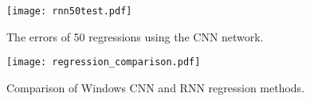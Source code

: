 \documentclass[../main.tex]{subfiles}
\begin{document}

%



\begin{figure}[H]
\begin{center}
\texttt{[image: rnn50test.pdf]}
\caption{The errors of 50 regressions using the CNN network.}
\label{fig:rnntest}
\end{center}
\end{figure}

\begin{figure}[h]
\begin{center}
\texttt{[image: regression\_comparison.pdf]}
\caption{Comparison of Windows CNN and RNN regression methods.}
\label{fig:regression_comp}
\end{center}
\end{figure}




\end{document}
